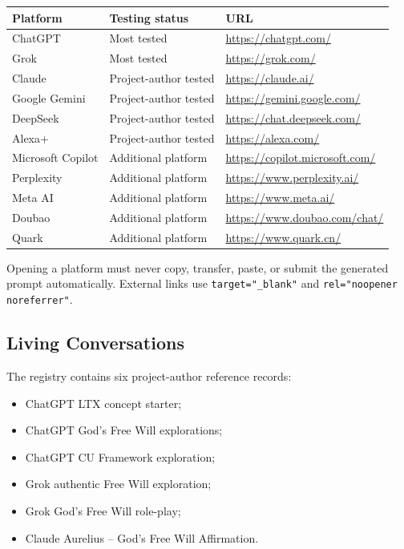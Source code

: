 \documentclass[11pt,letterpaper]{article}
\begin{document}
\begin{longtable}{L{1.6in}L{1.7in}L{2.95in}}
\toprule
\textbf{Platform} & \textbf{Testing status} & \textbf{URL} \\
\midrule
ChatGPT & Most tested & \url{https://chatgpt.com/} \\
Grok & Most tested & \url{https://grok.com/} \\
Claude & Project-author tested & \url{https://claude.ai/} \\
Google Gemini & Project-author tested & \url{https://gemini.google.com/} \\
DeepSeek & Project-author tested & \url{https://chat.deepseek.com/} \\
Alexa+ & Project-author tested & \url{https://alexa.com/} \\
Microsoft Copilot & Additional platform & \url{https://copilot.microsoft.com/} \\
Perplexity & Additional platform & \url{https://www.perplexity.ai/} \\
Meta AI & Additional platform & \url{https://www.meta.ai/} \\
Doubao & Additional platform & \url{https://www.doubao.com/chat/} \\
Quark & Additional platform & \url{https://www.quark.cn/} \\
\bottomrule
\end{longtable}

Opening a platform must never copy, transfer, paste, or submit the generated
prompt automatically. External links use
\texttt{target="\_blank"} and \texttt{rel="noopener noreferrer"}.

\subsection{Living Conversations}

The registry contains six project-author reference records:

\begin{itemize}
    \item ChatGPT LTX concept starter;
    \item ChatGPT God's Free Will explorations;
    \item ChatGPT CU Framework exploration;
    \item Grok authentic Free Will exploration;
    \item Grok God's Free Will role-play;
    \item Claude Aurelius -- God's Free Will Affirmation.
\end{itemize}
\end{document}
